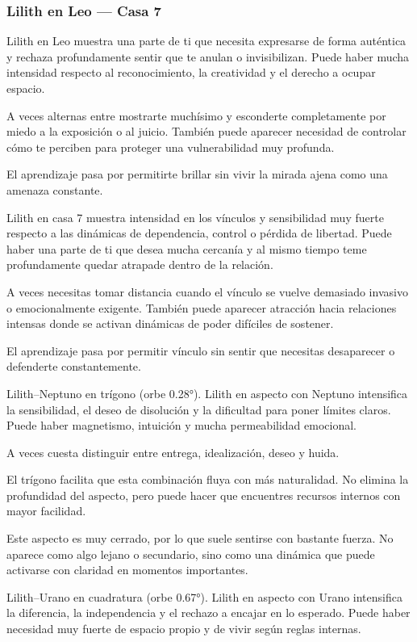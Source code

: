 \documentclass[11pt,a4paper]{article}
\begin{document}
\subsubsection*{Lilith en Leo — Casa 7}

Lilith en Leo muestra una parte de ti que necesita expresarse de forma auténtica y rechaza profundamente sentir que te anulan o invisibilizan. Puede haber mucha intensidad respecto al reconocimiento, la creatividad y el derecho a ocupar espacio.

A veces alternas entre mostrarte muchísimo y esconderte completamente por miedo a la exposición o al juicio. También puede aparecer necesidad de controlar cómo te perciben para proteger una vulnerabilidad muy profunda.

El aprendizaje pasa por permitirte brillar sin vivir la mirada ajena como una amenaza constante.

Lilith en casa 7 muestra intensidad en los vínculos y sensibilidad muy fuerte respecto a las dinámicas de dependencia, control o pérdida de libertad. Puede haber una parte de ti que desea mucha cercanía y al mismo tiempo teme profundamente quedar atrapade dentro de la relación.

A veces necesitas tomar distancia cuando el vínculo se vuelve demasiado invasivo o emocionalmente exigente. También puede aparecer atracción hacia relaciones intensas donde se activan dinámicas de poder difíciles de sostener.

El aprendizaje pasa por permitir vínculo sin sentir que necesitas desaparecer o defenderte constantemente.

Lilith–Neptuno en trígono (orbe 0.28°).
Lilith en aspecto con Neptuno intensifica la sensibilidad, el deseo de disolución y la dificultad para poner límites claros. Puede haber magnetismo, intuición y mucha permeabilidad emocional.

A veces cuesta distinguir entre entrega, idealización, deseo y huida.

El trígono facilita que esta combinación fluya con más naturalidad. No elimina la profundidad del aspecto, pero puede hacer que encuentres recursos internos con mayor facilidad.

Este aspecto es muy cerrado, por lo que suele sentirse con bastante fuerza. No aparece como algo lejano o secundario, sino como una dinámica que puede activarse con claridad en momentos importantes.

Lilith–Urano en cuadratura (orbe 0.67°).
Lilith en aspecto con Urano intensifica la diferencia, la independencia y el rechazo a encajar en lo esperado. Puede haber necesidad muy fuerte de espacio propio y de vivir según reglas internas.
\end{document}
